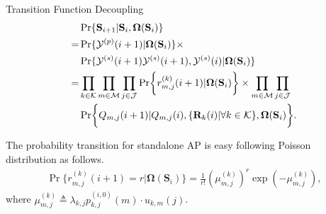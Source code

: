 \documentclass[10pt, conference, letterpaper]{IEEEtran}
\newcommand{\define}{\triangleq}
\renewcommand{\vec}{\mathbf}
\DeclarePairedDelimiter{\set}{\{}{\}}
\DeclarePairedDelimiter{\Brace}{\bigg\{}{\bigg\}}
\newcommand{\apSet}{\mathcal{K}}
\newcommand{\esSet}{\mathcal{M}}
\newcommand{\jSpace}{\mathcal{J}}
\newcommand{\Stat}{\mathbf{S}}
\newcommand{\Obsv}{\mathcal{Y}}
\newcommand{\Policy}{\boldsymbol{\Omega}}
\newcommand{\BPolicy}{\Policy} %
\begin{document}
    \begin{section}{Transition Function Decoupling}
        \label{trans-decouple}
        \begin{align}
            & \Pr\{\Stat_{i+1}|\Stat_{i}, \BPolicy(\Stat_{i})\}
            \nonumber\\
            =& \Pr\{\Obsv^{(p)}(i+1)|\BPolicy(\Stat_{i})\} \times
                \nonumber\\
                &\Pr\{\Obsv^{(s)}(i+1)\Obsv^{(s)}(i+1), \Obsv^{(s)}(i)|\BPolicy(\Stat_{i})\}
            \nonumber\\
            =& \prod_{k\in\apSet}\prod_{m\in\esSet}\prod_{j\in\jSpace}
                    \Pr\Brace{r^{(k)}_{m,j}(i+1)|\BPolicy(\Stat_{i})}
                    \times \prod_{m\in\esSet}\prod_{j\in\jSpace}
                \nonumber\\
                & \Pr\Brace{Q_{m,j}(i+1)|Q_{m,j}(i), \set{\vec{R}_k(i)|\forall k\in\apSet}, \BPolicy(\Stat_{i})}.
        \end{align}
        
        The probability transition for standalone AP is easy following Poisson distribution as follows.
        \begin{align}
            \Pr\{r^{(k)}_{m,j}(i+1)=r|\BPolicy(\Stat_{i})\} = \frac{1}{r!}(\mu^{(k)}_{m,j})^r \exp(-\mu^{(k)}_{m,j}),
        \end{align}
        where $\mu^{(k)}_{m,j} \define \lambda_{k,j} p^{(i,0)}_{k,j}(m) \cdot u_{k,m}(j)$.
        

\end{section}
\end{document}

